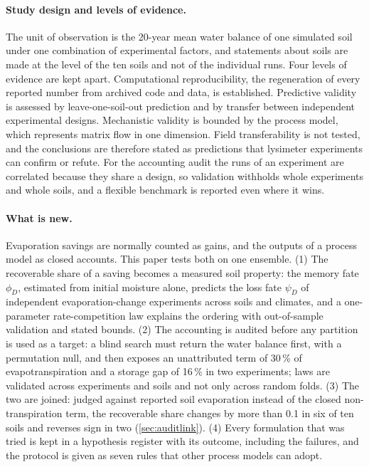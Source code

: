 \documentclass[preprint,12pt,authoryear]{elsarticle}
\begin{document}
\paragraph{Study design and levels of evidence.} The unit of observation is the 20-year mean water balance of one simulated soil under one combination of experimental factors, and statements about soils are made at the level of the ten soils and not of the individual runs. Four levels of evidence are kept apart. Computational reproducibility, the regeneration of every reported number from archived code and data, is established. Predictive validity is assessed by leave-one-soil-out prediction and by transfer between independent experimental designs. Mechanistic validity is bounded by the process model, which represents matrix flow in one dimension. Field transferability is not tested, and the conclusions are therefore stated as predictions that lysimeter experiments can confirm or refute. For the accounting audit the runs of an experiment are correlated because they share a design, so validation withholds whole experiments and whole soils, and a flexible benchmark is reported even where it wins.

\paragraph{What is new.} Evaporation savings are normally counted as gains, and the outputs of a process model as closed accounts. This paper tests both on one ensemble. (1) The recoverable share of a saving becomes a measured soil property: the memory fate $\phi_D$, estimated from initial moisture alone, predicts the loss fate $\psi_D$ of independent evaporation-change experiments across soils and climates, and a one-parameter rate-competition law explains the ordering with out-of-sample validation and stated bounds. (2) The accounting is audited before any partition is used as a target: a blind search must return the water balance first, with a permutation null, and then exposes an unattributed term of 30\,\% of evapotranspiration and a storage gap of 16\,\% in two experiments; laws are validated across experiments and soils and not only across random folds. (3) The two are joined: judged against reported soil evaporation instead of the closed non-transpiration term, the recoverable share changes by more than 0.1 in six of ten soils and reverses sign in two (\cref{sec:auditlink}). (4) Every formulation that was tried is kept in a hypothesis register with its outcome, including the failures, and the protocol is given as seven rules that other process models can adopt.
\end{document}
